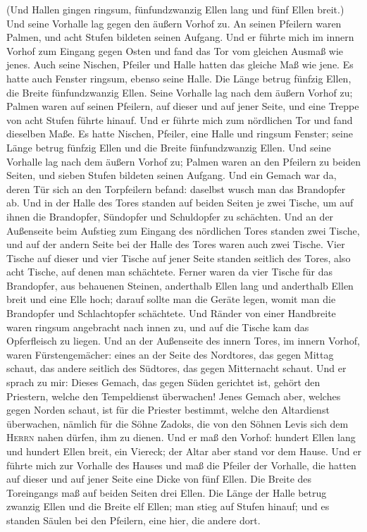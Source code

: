  (Und Hallen gingen ringsum, fünfundzwanzig Ellen lang
und fünf Ellen breit.)  Und seine Vorhalle lag gegen den
äußern Vorhof zu. An seinen Pfeilern waren Palmen, und acht Stufen
bildeten seinen Aufgang.  Und er führte mich im innern
Vorhof zum Eingang gegen Osten und fand das Tor vom gleichen Ausmaß wie
jenes.  Auch seine Nischen, Pfeiler und Halle hatten das
gleiche Maß wie jene. Es hatte auch Fenster ringsum, ebenso seine Halle.
Die Länge betrug fünfzig Ellen, die Breite fünfundzwanzig Ellen.
 Seine Vorhalle lag nach dem äußern Vorhof zu; Palmen
waren auf seinen Pfeilern, auf dieser und auf jener Seite, und eine
Treppe von acht Stufen führte hinauf.  Und er führte mich
zum nördlichen Tor und fand dieselben Maße.  Es hatte
Nischen, Pfeiler, eine Halle und ringsum Fenster; seine Länge betrug
fünfzig Ellen und die Breite fünfundzwanzig Ellen.  Und
seine Vorhalle lag nach dem äußern Vorhof zu; Palmen waren an den
Pfeilern zu beiden Seiten, und sieben Stufen bildeten seinen Aufgang.
 Und ein Gemach war da, deren Tür sich an den Torpfeilern
befand: daselbst wusch man das Brandopfer ab.  Und in der
Halle des Tores standen auf beiden Seiten je zwei Tische, um auf ihnen
die Brandopfer, Sündopfer und Schuldopfer zu schächten. 
Und an der Außenseite beim Aufstieg zum Eingang des nördlichen Tores
standen zwei Tische, und auf der andern Seite bei der Halle des Tores
waren auch zwei Tische.  Vier Tische auf dieser und vier
Tische auf jener Seite standen seitlich des Tores, also acht Tische, auf
denen man schächtete.  Ferner waren da vier Tische für
das Brandopfer, aus behauenen Steinen, anderthalb Ellen lang und
anderthalb Ellen breit und eine Elle hoch; darauf sollte man die Geräte
legen, womit man die Brandopfer und Schlachtopfer schächtete.
 Und Ränder von einer Handbreite waren ringsum angebracht
nach innen zu, und auf die Tische kam das Opferfleisch zu liegen.
 Und an der Außenseite des innern Tores, im innern
Vorhof, waren Fürstengemächer: eines an der Seite des Nordtores, das
gegen Mittag schaut, das andere seitlich des Südtores, das gegen
Mitternacht schaut.  Und er sprach zu mir: Dieses Gemach,
das gegen Süden gerichtet ist, gehört den Priestern, welche den
Tempeldienst überwachen!  Jenes Gemach aber, welches
gegen Norden schaut, ist für die Priester bestimmt, welche den
Altardienst überwachen, nämlich für die Söhne Zadoks, die von den Söhnen
Levis sich dem \textsc{Herrn} nahen dürfen, ihm zu dienen.
 Und er maß den Vorhof: hundert Ellen lang und hundert
Ellen breit, ein Viereck; der Altar aber stand vor dem Hause.
 Und er führte mich zur Vorhalle des Hauses und maß die
Pfeiler der Vorhalle, die hatten auf dieser und auf jener Seite eine
Dicke von fünf Ellen. Die Breite des Toreingangs maß auf beiden Seiten
drei Ellen.  Die Länge der Halle betrug zwanzig Ellen und
die Breite elf Ellen; man stieg auf Stufen hinauf; und es standen Säulen
bei den Pfeilern, eine hier, die andere dort.

